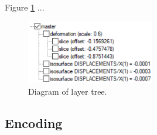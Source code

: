 



Figure \ref{fig:layers-tree} ...

\begin{figure}[H]
    \centering
    \includegraphics[width=0.5\textwidth]{figures/chapter-data-management/layers-tree-diagram}
    \decoRule
    \caption{Diagram of layer tree.}
    \label{fig:layers-tree}
\end{figure}




\subsection {Encoding}

